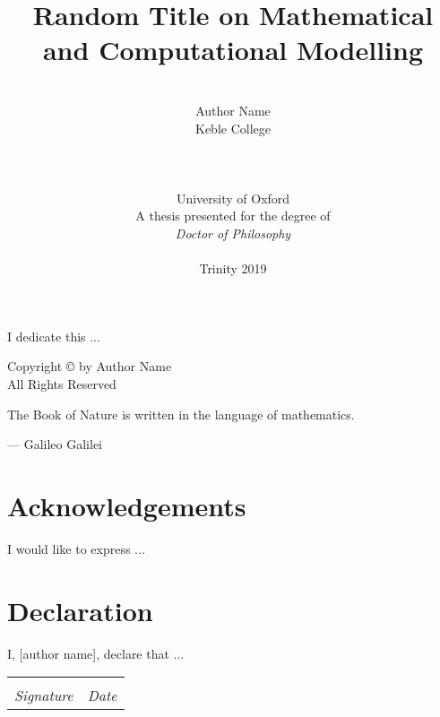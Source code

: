 \documentclass[12pt, a4paper]{report}
\date{}
\title{Random Title on Mathematical and Computational Modelling}
\author{\\ \Large{Author Name}
	\\ Keble College
	\\
	\\
	\\
	\\ University of Oxford
	\\
	A thesis presented for the degree of \\ \textit{Doctor of Philosophy}
	\\ \\
	Trinity 2019
}
\begin{document}
	\thispagestyle{headings}
	\maketitle
	\FloatBarrier
	
	\newpage
	\thispagestyle{empty}
	\begin{center}
		I dedicate this ...
	\end{center}
	
	\newpage
	\thispagestyle{empty}
	\vspace*{\fill}
	\begin{center}
		Copyright \copyright  {} by Author Name \\ All Rights Reserved
	\end{center}
	\vspace*{\fill}
	\newpage
	\thispagestyle{empty}
	\epigraph{The Book of Nature is written in the language of mathematics.}{--- \textup{Galileo Galilei}}
	
	\thispagestyle{empty}
	\chapter*{Acknowledgements}
	I would like to express ...
	
	
	\thispagestyle{empty}
	\chapter*{Declaration}
	I, [author name], declare that ...
	
	\vspace{3cm}
	\noindent\begin{tabular}{ll}
		\makebox[2.5in]{\hrulefill} & \makebox[2.5in]{\hrulefill}\\
		\textit{Signature} & \textit{Date}\\
	\end{tabular}
	
	\thispagestyle{empty}
	\begin{abstract}
		\lipsum[1-2]
		
	\end{abstract}
	\tableofcontents
	\thispagestyle{plain}
	\listoffigures
	\listoftables
	
\end{document}
